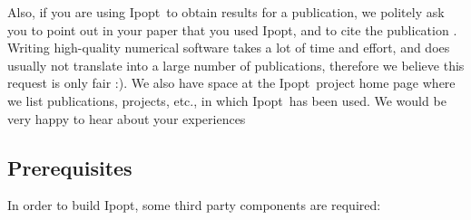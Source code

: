 \documentclass[10pt]{article}
\newcommand{\Ipopt}{{\sc Ipopt}}
\begin{document}
Also, if you are using \Ipopt\ to obtain results for a publication, we
politely ask you to point out in your paper that you used \Ipopt, and
to cite the publication \cite{WaecBieg06:mp}.  Writing high-quality
numerical software takes a lot of time and effort, and does usually
not translate into a large number of publications, therefore we
believe this request is only fair :).  We also have space at the
\Ipopt\ project home page where we list publications, projects, etc.,
in which \Ipopt\ has been used.  We would be very happy to hear about
your experiences

\subsection{Prerequisites}\label{sec:prerequisites}
In order to build \Ipopt, some third party components are required:
\end{document}
